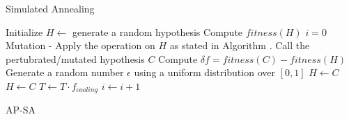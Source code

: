 \documentclass{beamer}
\begin{document}
    \begin{frame}[t]{Simulated Annealing}
        \fontsize{8}{8}\selectfont
        \begin{algorithm}[H]
            Initialize $H\leftarrow$ generate a random hypothesis \;
            Compute $fitness(H)$  \;
            $i=0$ \;
             {
                Mutation - Apply the operation on $H$ as stated in Algorithm . Call the pertubrated/mutated hypothesis $C$ \;
                Compute $\delta f = fitness(C) -fitness(H) $ \;
                 {
                    Generate a random number $\epsilon$ using a uniform distribution over $[0,1]$ \;
                     {
                        $H \leftarrow C$
                    }}  {
                    $H \leftarrow C$ \; }
                    $T \leftarrow T \cdot f_{cooling}$ \;
                    $i \leftarrow i + 1$ \;
                } 
                \caption{AP-SA}
                \label{alg:ap-sa}
            \end{algorithm}
        \end{frame}
\end{document}
